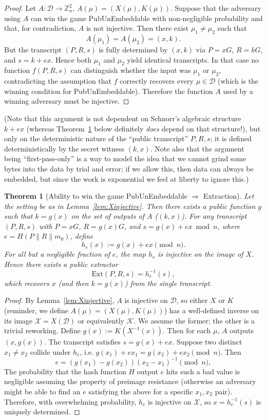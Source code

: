 \documentclass[10pt,a4paper]{article}
\newtheorem{theorem}{Theorem}
\theoremstyle{definition}   %
\theoremstyle{remark}       %
\begin{document}
\begin{proof}
Let $A:\mathcal{D}\to \mathbb{Z}_n^2$, $A(\mu)=(X(\mu),K(\mu))$.
Suppose that the adversary using $A$ can win the game PubUnEmbeddable with non-negligible probability and that, for contradiction, $A$ is not injective.
Then there exist $\mu_1\neq \mu_2$ such that
\[
A(\mu_1) = A(\mu_2) = (x,k).
\]
But the transcript $(P,R,s)$ is fully determined by $(x,k)$ via
$P=xG$, $R=kG$, and $s=k+ex$. Hence both $\mu_1$ and $\mu_2$ yield
identical transcripts. In that case no function $f(P,R,s)$ can
distinguish whether the input was $\mu_1$ or $\mu_2$, contradicting
the assumption that $f$ correctly recovers every $\mu\in\mathcal D$ (which is the winning condition for PubUnEmbeddable).
Therefore the function $A$ used by a winning adversary must be injective.
\end{proof}

(Note that this argument is not dependent on Schnorr's algebraic structure $k + ex$ (whereas Theorem~\ref{thm:extraction} below definitely \emph{does} depend on that structure!), but only on the deterministic nature of the ``public transcript'' $P, R, s$; it is defined deterministically by the secret witness $(k, x)$. Note also that the argument being ``first-pass-only'' is a way to model the idea that we cannot grind some bytes into the data by trial and error; if we allow this, then data can always be embedded, but since the work is exponential we feel at liberty to ignore this.)

\begin{theorem}[Ability to win the game PubUnEmbeddable $\Rightarrow$ Extraction]
\label{thm:extraction}
Let the setting be as in Lemma~\ref{lem:Xinjective}.
Then there exists a public function $g$ such that $k=g(x)$ on the set of outputs of $A$ ($(k, x)$).
For any transcript $(P,R,s)$ with $P=xG$, $R=g(x)G$, and $s=g(x)+ex\bmod n$,
where $e=H(P\|R\|m_0)$, define
\[
h_e(x) := g(x) + e x \pmod n.
\]
For all but a negligible fraction of $e$, the map $h_e$ is injective on
the image of $X$. Hence there exists a public extractor
\[
\mathrm{Ext}(P,R,s) = h_e^{-1}(s),
\]
which recovers $x$ (and then $k=g(x)$) from the single transcript.
\end{theorem}

\begin{proof}
By Lemma~\ref{lem:Xinjective}, $A$ is injective on $\mathcal{D}$,
so either $X$ or $K$ (reminder, we define $A(\mu) = (X(\mu), K(\mu))$) has a well-defined inverse on its image $\mathcal{X}=X(\mathcal{D})$ or equivalently $\mathcal{K}$. We assume the former; the other is a trivial reworking.
Define $g(x):=K(X^{-1}(x))$. Then for each $\mu$, $A$ outputs $(x,g(x))$.
The transcript satisfies $s=g(x)+ex$.
Suppose two distinct $x_1\neq x_2$ collide under $h_e$, i.e.
$g(x_1)+e x_1 = g(x_2)+e x_2 \pmod n$.
Then
\[
e = (g(x_1)-g(x_2))(x_2-x_1)^{-1}\pmod n,
\]
The probability that the hash function $H$ output $e$
hits such a bad value is negligible assuming the property of preimage resistance (otherwise an adversary might be able to find an $e$ satisfying the above for a specific $x_1, x_2$ pair). Therefore, with overwhelming probability, $h_e$ is injective on $\mathcal{X}$, so $x=h_e^{-1}(s)$ is uniquely determined.
\end{proof}
\end{document}
